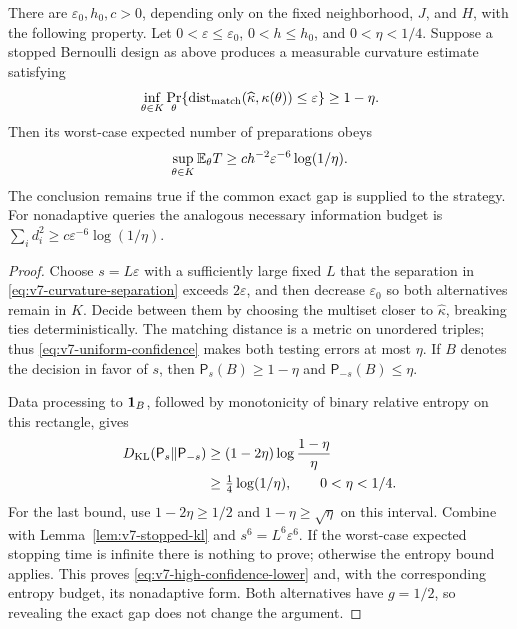 \begin{theorem}
\label{thm:v7-count-lower}
There are $\varepsilon_0,h_0,c>0$, depending only on the fixed neighborhood, $J$, and $H$, with the following property. Let $0<\varepsilon\le\varepsilon_0$, $0<h\le h_0$, and $0<\eta<1/4$. Suppose a stopped Bernoulli design as above produces a measurable curvature estimate satisfying
\begin{equation}\label{eq:v7-uniform-confidence}
 \inf_{\theta\in K}
 \Pr_\theta\{\operatorname{dist}_{\rm match}(\widehat\kappa,\kappa(\theta))
                                      \le\varepsilon\}\ge1-\eta.
\end{equation}
Then its worst-case expected number of preparations obeys
\begin{equation}\label{eq:v7-high-confidence-lower}
                  \sup_{\theta\in K}\mathbb E_\theta T
                  \ge c h^{-2}\varepsilon^{-6}\log(1/\eta).
\end{equation}
The conclusion remains true if the common exact gap is supplied to the strategy. For nonadaptive queries the analogous necessary information budget is $\sum_i d_i^2\ge c\varepsilon^{-6}\log(1/\eta)$.
\end{theorem}
\begin{proof}
Choose $s=L\varepsilon$ with a sufficiently large fixed $L$ that the separation in \eqref{eq:v7-curvature-separation} exceeds $2\varepsilon$, and then decrease $\varepsilon_0$ so both alternatives remain in $K$. Decide between them by choosing the multiset closer to $\widehat\kappa$, breaking ties deterministically. The matching distance is a metric on unordered triples; thus \eqref{eq:v7-uniform-confidence} makes both testing errors at most $\eta$. If $B$ denotes the decision in favor of $s$, then $\mathsf P_s(B)\ge1-\eta$ and $\mathsf P_{-s}(B)\le\eta$.

Data processing to $\mathbf1_B$, followed by monotonicity of binary relative entropy on this rectangle, gives
\begin{align*}
 D_{\rm KL}(\mathsf P_s\Vert\mathsf P_{-s})
 &\ge (1-2\eta)\log\frac{1-\eta}{\eta}\\
 &\ge \tfrac14\log(1/\eta),\qquad 0<\eta<1/4.
\end{align*}
For the last bound, use $1-2\eta\ge1/2$ and $1-\eta\ge\sqrt\eta$ on this interval. Combine with Lemma~\ref{lem:v7-stopped-kl} and $s^6=L^6\varepsilon^6$. If the worst-case expected stopping time is infinite there is nothing to prove; otherwise the entropy bound applies. This proves \eqref{eq:v7-high-confidence-lower} and, with the corresponding entropy budget, its nonadaptive form. Both alternatives have $g=1/2$, so revealing the exact gap does not change the argument.
\end{proof}


